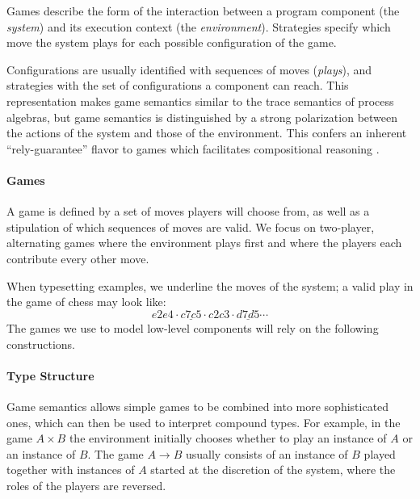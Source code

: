 \documentclass[sigplan,screen]{acmart}
\begin{document}
Games describe the form of the interaction
between a program component %
(the \emph{system})
and its execution context
(the \emph{environment}).
Strategies
specify which move the system plays
for each possible configuration of the game.

Configurations are usually identified with sequences of moves
(\emph{plays}),
and strategies with the set of configurations
a component can reach.
This representation makes
game semantics similar to
the trace semantics of process algebras,
but game semantics is distinguished
by a strong polarization between
the actions of the system and those of the environment.
This confers an inherent ``rely-guarantee'' flavor
to games which facilitates compositional reasoning
\cite{cspgs}.


\paragraph{Games} \label{sec:mainideas:gs:games} %

A game is defined by a set of moves
players will choose from,
as well as a stipulation of which
sequences of moves are valid.
We focus on two-player, alternating games
where the environment plays first and
where the players
each contribute every other move.

When typesetting examples,
we underline the moves of the system;
a valid play in the game of chess may look like:
\[ e2e4 \cdot \underline{c7c5} \cdot c2c3 \cdot \underline{d7d5} \cdots \]
The games we use to model low-level components
will rely on the following constructions.


\paragraph{Type Structure} \label{sec:mainideas:gs:types} %

Game semantics allows
simple games to be combined into more sophisticated ones,
which can then be used
to interpret compound types.
For example,
in the game $A \times B$
the environment initially chooses whether to play
an instance of $A$ or an instance of $B$.
The game $A \rightarrow B$ usually consists of
an instance of $B$ played
together with instances of $A$
started at the discretion of the system,
where the roles of the players are reversed.
\end{document}

